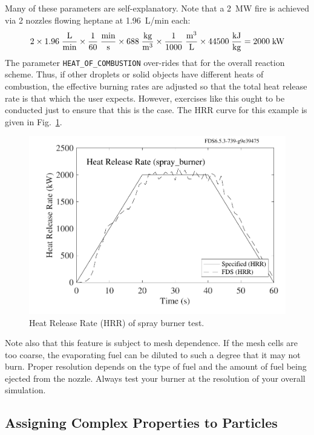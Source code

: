 \documentclass[11pt]{book}
\newcommand{\ct}{\tt\small}
\newcommand{\be}{\begin{equation}}
\newcommand{\ee}{\end{equation}}
\begin{document}
\noindent
Many of these parameters are self-explanatory. Note that a 2~MW fire is achieved via 2 nozzles flowing heptane at 1.96~L/min each:
\be 2 \times 1.96 \; \frac{\hbox{L}}{\hbox{min}} \times \frac{1}{60} \; \frac{\hbox{min}}{\hbox{s}} \times 688 \;
\frac{\hbox{kg}}{\hbox{m}^3} \times \frac{1}{1000} \; \frac{\hbox{m}^3}{\hbox{L}} \times 44500 \;
\frac{\hbox{kJ}}{\hbox{kg}} = 2000 \; \hbox{kW} \ee
The parameter {\ct HEAT\_OF\_COMBUSTION} over-rides that for the overall
reaction scheme. Thus, if other droplets or solid objects have different
heats of combustion, the effective burning rates are adjusted so that the
total heat release rate is that which the user expects. However, exercises
like this ought to be conducted just to ensure that this is the case.
The HRR curve for this example is given in Fig.~\ref{spray_burner}.

\begin{figure}[ht]
\begin{center}
\includegraphics[width=4.5in]{SCRIPT_FIGURES/spray_burner_HRR}
\end{center}
\caption[HRR of spray burner.]{Heat Release Rate (HRR) of spray burner test.}
\label{spray_burner}
\end{figure}

Note also that this feature is subject to mesh
dependence. If the mesh cells are too coarse, the
evaporating fuel can be diluted to such a degree that it
may not burn. Proper resolution depends on the type of
fuel and the amount of fuel being ejected from the
nozzle. Always test your burner at the resolution of your overall simulation.


\subsection{Assigning Complex Properties to Particles}
\label{info:PART_SURF}
\end{document}
